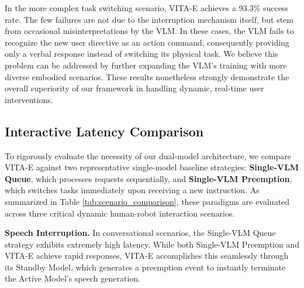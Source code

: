 \begin{table}[h]
    \vspace{-2em}
    \caption{Success rates on interactive tasks (30 trials).}
    \label{tab:interactive-tasks}
    \centering
    \vspace{-2em}
\end{table}

In the more complex task switching scenario, VITA-E achieves a 93.3\% success rate. The few failures are not due to the interruption mechanism itself, but stem from occasional misinterpretations by the VLM. In these cases, the VLM fails to recognize the new user directive as an action command, consequently providing only a verbal response instead of switching its physical task. We believe this problem can be addressed by further expanding the VLM's training with more diverse embodied scenarios. These results nonetheless strongly demonstrate the overall superiority of our framework in handling dynamic, real-time user interventions.

\subsection{Interactive Latency Comparison}

To rigorously evaluate the necessity of our dual-model architecture, we compare VITA-E against two representative single-model baseline strategies: \textbf{Single-VLM Queue}, which processes requests sequentially, and \textbf{Single-VLM Preemption}, which switches tasks immediately upon receiving a new instruction. As summarized in Table \ref{tab:scenario_comparison}, these paradigms are evaluated across three critical dynamic human-robot interaction scenarios.

\textbf{Speech Interruption.} In conversational scenarios, the Single-VLM Queue strategy exhibits extremely high latency. While both Single-VLM Preemption and VITA-E achieve rapid responses, VITA-E accomplishes this seamlessly through its Standby Model, which generates a preemption event to instantly terminate the Active Model's speech generation.

